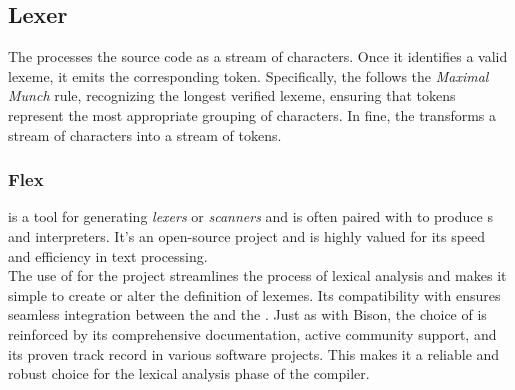 \newpage 
\subsection{Lexer}

The \lexer{} processes the source code as a stream of characters. Once it identifies
a valid lexeme, it emits the corresponding token. Specifically, the \lexer{} follows
the \textit{Maximal Munch} rule, recognizing the longest verified lexeme, ensuring that tokens
represent the most appropriate grouping of characters. In fine, the \lexer{}
transforms a stream of characters into a stream of tokens.



\subsubsection{Flex}

\lexerGen{} is a tool for generating \textit{lexers} or \textit{scanners} and is
often paired with \parserGen{} to produce \parser{}s and interpreters. It's an
open-source project and is highly valued for its speed and efficiency in text
processing. \\

The use of \lexerGen{} for the \lang{} project streamlines the process of lexical
analysis and makes it simple to create or alter the definition of lexemes. Its
compatibility with \parserGen{} ensures seamless integration between the \lexer{} and
the \parser{}. Just as with Bison, the choice of \lexerGen{} is reinforced by its
comprehensive documentation, active community support, and its proven track record in
various software projects. This makes it a reliable and robust choice for the lexical
analysis phase of the \lang{} compiler.

